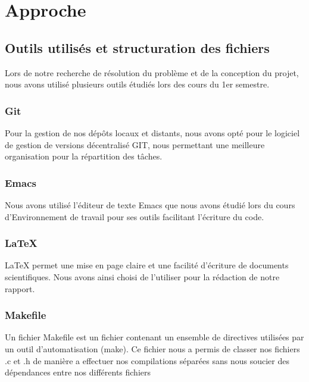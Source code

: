 \documentclass{article}
\begin{document}
\section{Approche}
    {
    
    \subsection{Outils utilisés et structuration des fichiers}
    {
    Lors de notre recherche de résolution du problème et de la conception du projet, nous avons utilisé plusieurs outils étudiés lors des cours du 1er semestre.
    
        \subsubsection{Git}
        {
        Pour la gestion de nos dépôts locaux et distants, nous avons opté pour le logiciel de gestion de versions décentralisé GIT, nous permettant une meilleure organisation pour la répartition des tâches.
        
        }
        
 
        \subsubsection{Emacs}
        {
        Nous avons utilisé l'éditeur de texte Emacs que nous avons étudié lors du cours d'Environnement de travail pour ses outils facilitant l'écriture du code.
        
        }
    
     
        \subsubsection{\LaTeX}
        {
        LaTeX permet une mise en page claire et une facilité d'écriture de documents scientifiques. Nous avons ainsi choisi de l'utiliser pour la rédaction de notre rapport.
        }
    
        \subsubsection{Makefile}
        {
        Un fichier Makefile est un fichier contenant un ensemble de directives utilisées par un outil d'automatisation (make). Ce fichier nous a permis de classer nos fichiers .c et .h de manière a effectuer nos compilations séparées sans nous soucier des dépendances entre nos différents fichiers
        
}}}
\end{document}
